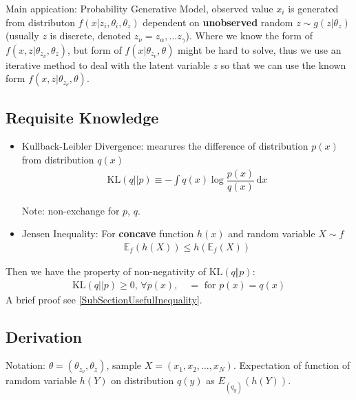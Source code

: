     Main appication: Probability Generative Model, observed value $ x_i $ is generated from distributon $ f(x|z_i,\theta _{i},\theta _z) $ dependent on \textbf{unobserved} random $ z\sim g(z|\theta _z) $(usually $ z $ is discrete, denoted $ z_\nu= z_\alpha ,\ldots z_\gamma  $). Where we know the form of $ f(x,z|\theta_{z_\nu},\theta_z) $, but form of $ f(x|\theta_{z_\nu},\theta) $ might be hard to solve, thus we use an iterative method to deal with the latent variable $ z $ so that we can use the known form $ f(x,z|\theta_{z_\nu},\theta) $.

\subsection{Requisite Knowledge}
    \begin{itemize}[topsep=2pt,itemsep=0pt]
        \item Kullback-Leibler Divergence: mearures the difference of distribution $ p(x) $ from distribution $ q(x) $
        \begin{align}
             \mathrm{KL}(q||p)\equiv -\int q(x)\log\dfrac{p(x)}{q(x)} \,\mathrm{d}x 
        \end{align}

        Note: non-exchange for $ p $, $ q $.
        \item Jensen Inequality: For \textbf{concave}  function $ h(x) $ and random variable $ X\sim f $
        \begin{align}
            \mathbb{E}_f\left(h(X)\right)\leq h\left(\mathbb{E}_f(X)\right) 
        \end{align}       
        
    \end{itemize}

    Then we have the property of non-negativity of $ \mathrm{KL}(q\Vert p)  $:
    \begin{align}
        \mathrm{KL}(q||p)\geq 0, \,\forall p(x),\quad = \text{ for }  p(x)=q(x) 
    \end{align}
    A brief proof see \autoref{SubSectionUsefulInequality}.
        
\subsection{Derivation}
    Notation: $ \theta=(\theta_{z_\nu},\theta_z) $, sample $ X=(x_{1},x_{2},\ldots,x_{N})  $. Expectation of function of ramdom variable $ h(Y) $ on distribution $ q(y) $ as $ E_{(q_y)}\left(h(Y)\right) $.

